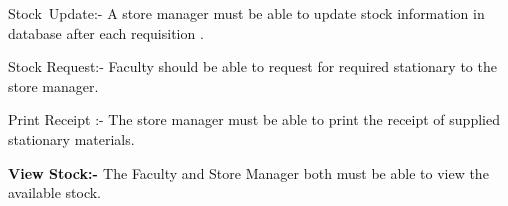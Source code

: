 \documentclass[12pt]{report}
\renewcommand{\_}{\kern-1.5pt\textunderscore\kern-1.5pt}
\begin{document}
\vspace{\baselineskip}
\begin{adjustwidth}{0.2in}{0.84in}
\begin{justify}
\textcolor[HTML]{0D0D0D}{Stock\ Update:-  A store manager must be able to update stock information in database after each requisition .}
\end{justify}\par

\end{adjustwidth}


\vspace{\baselineskip}
\begin{adjustwidth}{0.2in}{0.84in}
\begin{justify}
\textcolor[HTML]{0D0D0D}{Stock Request:- Faculty should be able to request for required stationary to the store manager.}
\end{justify}\par

\end{adjustwidth}


\vspace{\baselineskip}

\vspace{\baselineskip}

\vspace{\baselineskip}

\vspace{\baselineskip}
\begin{adjustwidth}{0.2in}{0.84in}
\begin{justify}
\textcolor[HTML]{0D0D0D}{Print Receipt :- The store manager must be able to print the receipt of supplied stationary materials.\  }
\end{justify}\par

\end{adjustwidth}


\vspace{\baselineskip}
\begin{adjustwidth}{0.2in}{0.84in}
\begin{justify}
\textbf{\textcolor[HTML]{0D0D0D}{View Stock:- }}\textcolor[HTML]{0D0D0D}{The Faculty and Store Manager both must be able to view the available stock.}
\end{justify}\par

\end{adjustwidth}


\vspace{\baselineskip}
\end{document}
